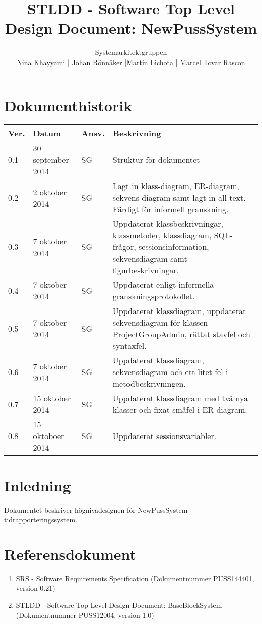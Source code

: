 \documentclass[a4paper]{article}
\title{STLDD - Software Top Level Design Document: NewPussSystem}
\author{Systemarkitektgruppen \\ Nina Khayyami | Johan Rönnåker |Martin Lichota | Marcel Tovar Rascon}
\date{}
\begin{document}
\maketitle
\thispagestyle{fancy}
\tableofcontents
\newpage

\section*{Dokumenthistorik}

\begin{tabular}{ l l l p{8.5cm} }
Ver. & Datum & Ansv. & Beskrivning \\\hline
0.1 & 30 september 2014 & SG & Struktur för dokumentet\\
0.2 & 2 oktober 2014 & SG & Lagt in klass-diagram, ER-diagram, sekvens-diagram samt lagt in all text. Färdigt för informell granskning.\\
0.3 & 7 oktober 2014 & SG & Uppdaterat klassbeskrivningar, klassmetoder, klassdiagram, SQL-frågor, sessionsinformation, sekvensdiagram samt figurbeskrivningar.\\
0.4 & 7 oktober 2014 & SG & Uppdaterat enligt informella granskningsprotokollet.\\
0.5 & 7 oktober 2014 & SG & Uppdaterat klassdiagram, uppdaterat sekvensdiagram för klassen ProjectGroupAdmin, rättat stavfel och syntaxfel.\\
0.6 & 7 oktober 2014 & SG & Uppdaterat klassdiagram, sekvensdiagram och ett litet fel i metodbeskrivningen.\\
0.7 & 15 oktober 2014 & SG & Uppdaterat klassdiagram med två nya klasser och fixat småfel i ER-diagram.\\
0.8 & 15 oktoboer 2014 & SG & Uppdaterat sessionsvariabler.

\end{tabular}
\newpage
\section{Inledning}       
Dokumentet beskriver högnivådesignen för NewPussSystem tidrapporteringssystem.



\section{Referensdokument}
\begin{enumerate}
\item SRS - Software Requirements Specification (Dokumentnummer PUSS144401, version 0.21)
\item STLDD - Software Top Level Design Document: BaseBlockSystem (Dokumentnummer PUSS12004, version 1.0)
\end{enumerate}
\end{document}
